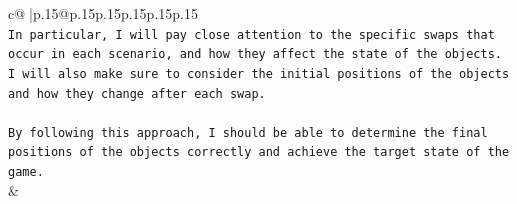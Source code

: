 \documentclass{article}
\begin{document}
{\begin{supertabular}{c@{$\;$}|p{.15\linewidth}@{}p{.15\linewidth}p{.15\linewidth}p{.15\linewidth}p{.15\linewidth}p{.15\linewidth}}
{{{\\ 
\texttt{In particular, I will pay close attention to the specific swaps that occur in each scenario, and how they affect the state of the objects. I will also make sure to consider the initial positions of the objects and how they change after each swap.} \\
\\ 
\texttt{By following this approach, I should be able to determine the final positions of the objects correctly and achieve the target state of the game.} \\
            }
        }
    }
    & \\ \\

\end{supertabular}
}
\end{document}
